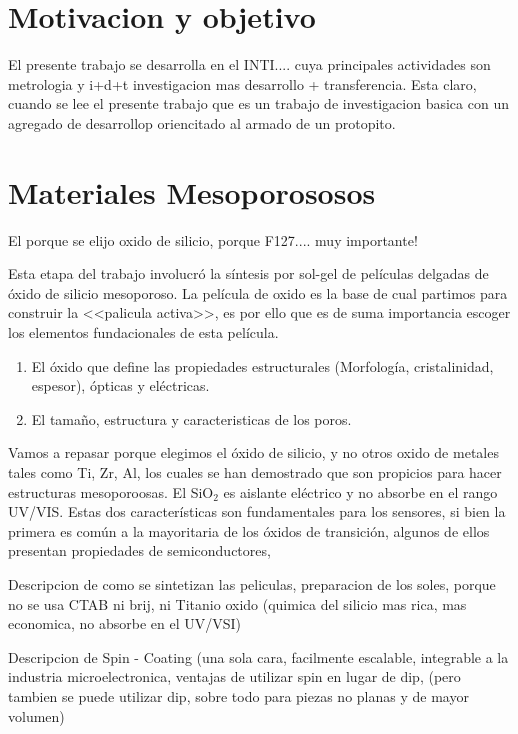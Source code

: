 \section{Motivacion y objetivo}

El presente trabajo se desarrolla en el INTI.... cuya principales actividades son metrologia y i+d+t investigacion mas desarrollo + transferencia.
Esta claro, cuando se lee el presente trabajo que es un trabajo de investigacion basica con un agregado de desarrollop oriencitado al armado de un protopito.


\section{Materiales Mesoporososos}\label{sec:mesoporosos}

				El porque se elijo oxido de silicio, porque F127.... muy importante!
				
				Esta etapa del trabajo involucró la síntesis por sol-gel de películas delgadas de óxido de silicio mesoporoso. La película de oxido es la base de cual partimos para construir la <<palicula activa>>, es por ello que es de suma importancia escoger los elementos fundacionales de esta película. \cite{Soler-Illia2002a,Brinker1999,Soler-Illia2006,Grosso2004,Innocenzi2013}

				\begin{enumerate}
					\item El óxido que define las propiedades estructurales (Morfología, cristalinidad, espesor), ópticas y eléctricas.
					\item El tamaño, estructura y caracteristicas de los poros.
				\end{enumerate}

				Vamos a repasar porque elegimos el óxido de silicio, y no otros oxido de metales tales como Ti, Zr, Al, los cuales se han demostrado que son propicios para hacer estructuras mesoporoosas. El SiO$_2$ es aislante eléctrico y no absorbe en el rango UV/VIS. Estas dos características son fundamentales para los sensores, si bien la primera es común a la mayoritaria de los óxidos de transición, algunos de ellos presentan propiedades de semiconductores, 

				Descripcion de como se sintetizan las peliculas, preparacion de los soles, porque no se usa CTAB ni brij, ni Titanio oxido (quimica del silicio mas rica, mas economica, no absorbe en el UV/VSI)

				Descripcion de Spin - Coating (una sola cara, facilmente escalable, integrable a la industria microelectronica, ventajas de utilizar spin en lugar de dip, (pero tambien se puede utilizar dip, sobre todo para piezas no planas y de mayor volumen)

